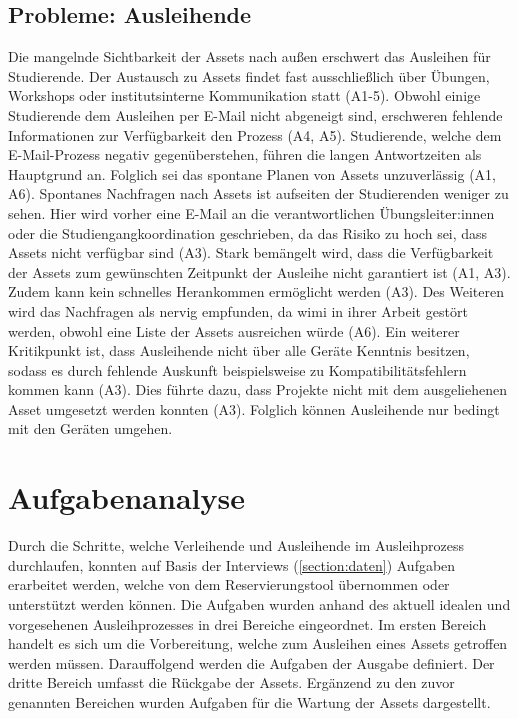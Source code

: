 \subsection{Probleme: Ausleihende}
\label{section:probleme-Ausleihende}
Die mangelnde Sichtbarkeit der Assets nach außen erschwert das Ausleihen für Studierende. Der
Austausch zu Assets findet fast ausschließlich über Übungen, Workshops oder institutsinterne
Kommunikation statt (A1-5). Obwohl einige Studierende dem Ausleihen per E-Mail nicht abgeneigt sind,
erschweren fehlende Informationen zur Verfügbarkeit den Prozess (A4, A5). Studierende, welche dem
E-Mail-Prozess negativ gegenüberstehen, führen die langen Antwortzeiten als Hauptgrund an. Folglich
sei das spontane Planen von Assets unzuverlässig (A1, A6). Spontanes Nachfragen nach Assets ist
aufseiten der Studierenden weniger zu sehen. Hier wird vorher eine E-Mail an die verantwortlichen
Übungsleiter:innen oder die Studiengangkoordination geschrieben, da das Risiko zu hoch sei, dass
Assets nicht verfügbar sind (A3). Stark bemängelt wird, dass die Verfügbarkeit der Assets zum
gewünschten Zeitpunkt der Ausleihe nicht garantiert ist (A1, A3). Zudem kann kein schnelles
Herankommen ermöglicht werden (A3). Des Weiteren wird das Nachfragen als nervig empfunden, da
\ac{wimi} in ihrer Arbeit gestört werden, obwohl eine Liste der Assets ausreichen würde (A6). Ein
weiterer Kritikpunkt ist, dass Ausleihende nicht über alle Geräte Kenntnis besitzen, sodass es durch
fehlende Auskunft beispielsweise zu Kompatibilitätsfehlern kommen kann (A3). Dies führte dazu, dass
Projekte nicht mit dem ausgeliehenen Asset umgesetzt werden konnten (A3). Folglich können
Ausleihende nur bedingt mit den Geräten umgehen.

\section{Aufgabenanalyse}
\label{section:aufgaben}
Durch die Schritte, welche Verleihende und Ausleihende im Ausleihprozess durchlaufen, konnten auf
Basis der Interviews (\ref{section:daten}) Aufgaben erarbeitet werden, welche von dem
Reservierungstool übernommen oder unterstützt werden können. Die Aufgaben wurden anhand des aktuell
idealen und vorgesehenen Ausleihprozesses in drei Bereiche eingeordnet. Im ersten Bereich handelt es
sich um die Vorbereitung, welche zum Ausleihen eines Assets getroffen werden müssen. Darauffolgend
werden die Aufgaben der Ausgabe definiert. Der dritte Bereich umfasst die Rückgabe der Assets.
Ergänzend zu den zuvor genannten Bereichen wurden Aufgaben für die Wartung der Assets dargestellt.

